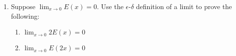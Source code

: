 \documentclass{article}
\newcommand{\D}{\displaystyle}
\begin{document}
\begin{enumerate}
\newpage



\item Suppose $\D \lim_{x\to 0} E(x) = 0$. Use the $\epsilon$-$\delta$ definition of a limit to prove the following:

\begin{enumerate}

\item $\D \lim_{x\to 0} 2E(x) = 0$

\vspace{4cm}

\item $\D \lim_{x\to 0} E(2x) = 0$

\vspace{4cm}

\end{enumerate}

\end{enumerate}
\end{document}
